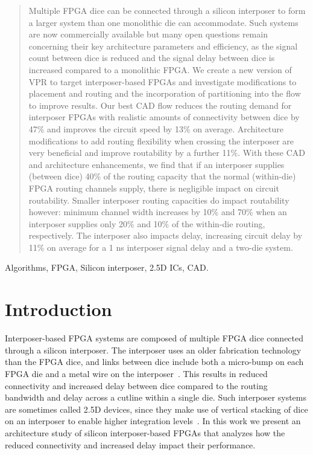 \documentclass[journal]{IEEEtran}
\begin{document}
\begin{abstract}
Multiple FPGA dice can be connected through a silicon interposer to form a larger system than one monolithic die can accommodate. Such systems are now commercially available but many open questions remain concerning their key architecture parameters and efficiency, as the signal count between dice is reduced and the signal delay between dice is increased compared to a monolithic FPGA.
We create a new version of VPR to target interposer-based FPGAs and investigate modifications to placement and routing and the incorporation of partitioning into the flow to improve results. Our best CAD flow reduces the routing demand for interposer FPGAs with realistic amounts of connectivity between dice by 47\% and improves the circuit speed by 13\% on average. Architecture modifications to add routing flexibility when crossing the interposer are very beneficial and improve routability by a further 11\%. With these CAD and architecture enhancements, we find that if an interposer supplies (between dice) 40\% of the routing capacity that the normal (within-die) FPGA routing channels supply, there is negligible impact on circuit routability. Smaller interposer routing capacities do impact routability however: minimum channel width increases by 10\% and 70\% when an interposer supplies only 20\% and 10\% of the within-die routing, respectively. The interposer also impacts delay, increasing circuit delay by 11\% on average for a 1 ns interposer signal delay and a two-die system. 
\end{abstract}

\begin{IEEEkeywords}
Algorithms, FPGA, Silicon interposer, 2.5D ICs, CAD. 
\end{IEEEkeywords}



\section{Introduction}
\label{introSection} 
Interposer-based FPGA systems are composed of multiple FPGA dice connected through a silicon interposer. The interposer uses an older fabrication technology than the FPGA dice, and links between dice include both a micro-bump on each FPGA die and a metal wire on the interposer~\cite{xilinxTSVperformance}. This results in reduced connectivity and increased delay between dice compared to the routing bandwidth and delay across a cutline within a single die. Such interposer systems are sometimes called 2.5D devices, since they make use of vertical stacking of dice on an interposer to enable higher integration levels~\cite{3dhandbook}. In this work we present an architecture study of silicon interposer-based FPGAs that analyzes how the reduced connectivity and increased delay impact their performance.
\end{document}

